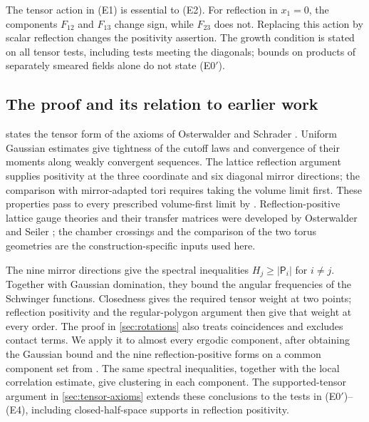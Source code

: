 The tensor action in \textup{(E1)} is essential to
\textup{(E2)}. For reflection in $x_1=0$, the components $F_{12}$ and
$F_{13}$ change sign, while $F_{23}$ does not. Replacing this action
by scalar reflection changes the positivity assertion.
The growth condition is stated on all tensor tests, including tests
meeting the diagonals; bounds on products of separately smeared fields
alone do not state \textup{(E0$'$)}.


\subsection{The proof and its relation to earlier work}

 states the tensor form of the axioms of
Osterwalder and Schrader \cite{OS1973,OS1975}. Uniform Gaussian
estimates give tightness of the cutoff laws and convergence of their
moments along weakly convergent sequences. The lattice reflection
argument supplies positivity at the
three coordinate and six diagonal mirror directions; the comparison
with mirror-adapted tori requires taking the volume limit first.
These properties pass to every prescribed volume-first limit by
\cite{ChamberLattice,ContinuumLimits}. Reflection-positive lattice
gauge theories and their transfer matrices were developed by
Osterwalder and Seiler \cite{OsterwalderSeiler1978}; the chamber
crossings and the comparison of the two torus geometries are the
construction-specific inputs used here.

The nine mirror directions give the spectral inequalities
$H_j\ge|\mathsf P_i|$ for $i\ne j$. Together with Gaussian
domination, they bound the angular frequencies of the Schwinger
functions. Closedness gives the required tensor weight at two
points; reflection positivity and the regular-polygon argument then
give that weight at every order. The proof in \cref{sec:rotations}
also treats coincidences and excludes contact terms. We apply it
to almost every ergodic component, after obtaining the Gaussian
bound and the nine reflection-positive forms on a common component
set from \cite{ErgodicComponents}. The same spectral inequalities,
together with the local correlation estimate, give clustering in
each component. The supported-tensor argument
in \cref{sec:tensor-axioms} extends these conclusions to the tests
in \textup{(E0$'$)}--\textup{(E4)}, including closed-half-space
supports in reflection positivity.

